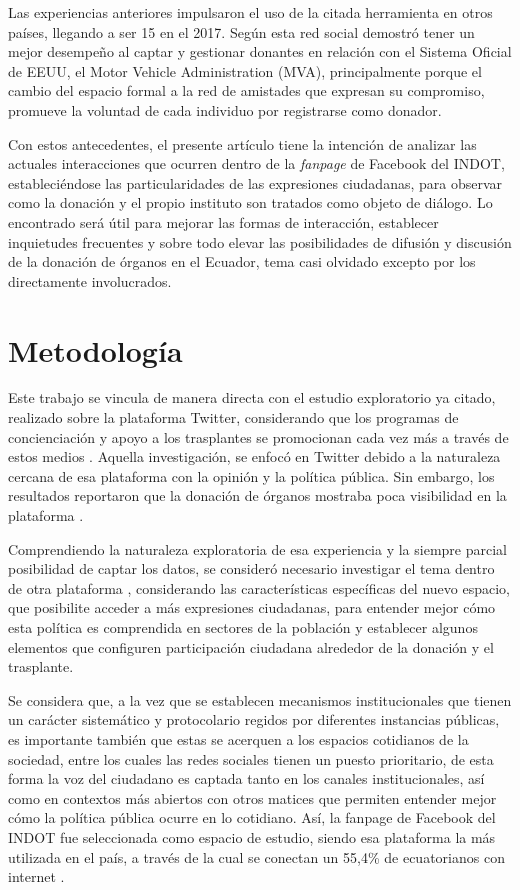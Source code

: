 \documentclass[spanish]{textolivre}
\begin{document}
Las experiencias anteriores impulsaron el uso de la citada herramienta en otros países, llegando a ser 15 en el 2017. Según \textcite{cameron2015} esta red social demostró tener un mejor desempeño al captar y gestionar donantes en relación con el Sistema Oficial de EEUU, el Motor Vehicle Administration (MVA), principalmente porque el cambio del espacio formal a la red de amistades que expresan su compromiso, promueve la voluntad de cada individuo por registrarse como donador. 

Con estos antecedentes, el presente artículo tiene la intención de analizar las actuales interacciones que ocurren dentro de la \emph{fanpage} de Facebook del INDOT, estableciéndose las particularidades de las expresiones ciudadanas, para observar como la donación y el propio instituto son tratados como objeto de diálogo. Lo encontrado será útil para mejorar las formas de interacción, establecer inquietudes frecuentes y sobre todo elevar las posibilidades de difusión y discusión de la donación de órganos en el Ecuador, tema casi olvidado excepto por los directamente involucrados.


\section{Metodología}\label{sec-metodologia}
Este trabajo se vincula de manera directa con el estudio exploratorio ya citado, realizado sobre la plataforma Twitter, considerando que los programas de concienciación y apoyo a los trasplantes se promocionan cada vez más a través de estos medios \cite{henderson2017}. Aquella investigación, se enfocó en Twitter debido a la naturaleza cercana de esa plataforma con la opinión y la política pública. Sin embargo, los resultados reportaron que la donación de órganos mostraba poca visibilidad en la plataforma \cite{dos_santos2020}.

Comprendiendo la naturaleza exploratoria de esa experiencia y la siempre parcial posibilidad de captar los datos, se consideró necesario investigar el tema dentro de otra plataforma \cite{elcomercio2020}, considerando las características específicas del nuevo espacio, que posibilite acceder a más expresiones ciudadanas, para entender mejor cómo esta política es comprendida en sectores de la población y establecer algunos elementos que configuren participación ciudadana alrededor de la donación y el trasplante. 

Se considera que, a la vez que se establecen mecanismos institucionales que tienen un carácter sistemático y protocolario regidos por diferentes instancias públicas, es importante también que estas se acerquen a los espacios cotidianos de la sociedad, entre los cuales las redes sociales tienen un puesto prioritario, de esta forma la voz del ciudadano es captada tanto en los canales institucionales, así como en contextos más abiertos con otros matices que permiten entender mejor cómo la política pública ocurre en lo cotidiano. Así, la fanpage de Facebook del INDOT fue seleccionada como espacio de estudio, siendo esa plataforma la más utilizada en el país, a través de la cual se conectan un 55,4\% de ecuatorianos con internet \cite{elcomercio2020}. 
\end{document}
